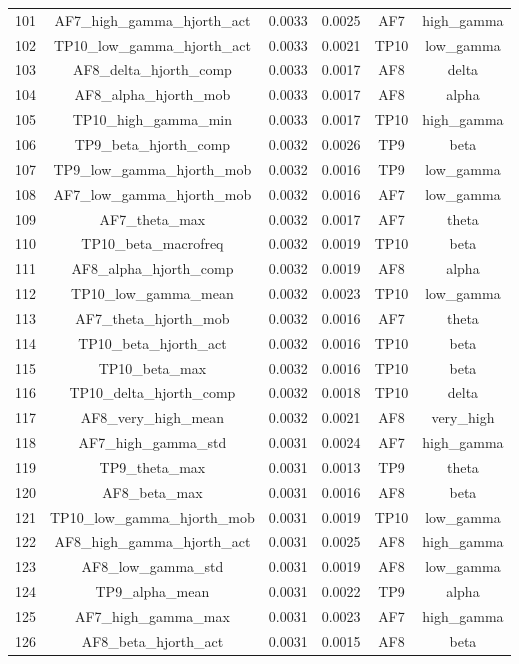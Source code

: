 \begin{table}[hptb]
\begin{table}
\begin{tabular}{cccccc}
101 & AF7_high_gamma_hjorth_act & 0.0033 & 0.0025 & AF7 & high_gamma \\
102 & TP10_low_gamma_hjorth_act & 0.0033 & 0.0021 & TP10 & low_gamma \\
103 & AF8_delta_hjorth_comp & 0.0033 & 0.0017 & AF8 & delta \\
104 & AF8_alpha_hjorth_mob & 0.0033 & 0.0017 & AF8 & alpha \\
105 & TP10_high_gamma_min & 0.0033 & 0.0017 & TP10 & high_gamma \\
106 & TP9_beta_hjorth_comp & 0.0032 & 0.0026 & TP9 & beta \\
107 & TP9_low_gamma_hjorth_mob & 0.0032 & 0.0016 & TP9 & low_gamma \\
108 & AF7_low_gamma_hjorth_mob & 0.0032 & 0.0016 & AF7 & low_gamma \\
109 & AF7_theta_max & 0.0032 & 0.0017 & AF7 & theta \\
110 & TP10_beta_macrofreq & 0.0032 & 0.0019 & TP10 & beta \\
111 & AF8_alpha_hjorth_comp & 0.0032 & 0.0019 & AF8 & alpha \\
112 & TP10_low_gamma_mean & 0.0032 & 0.0023 & TP10 & low_gamma \\
113 & AF7_theta_hjorth_mob & 0.0032 & 0.0016 & AF7 & theta \\
114 & TP10_beta_hjorth_act & 0.0032 & 0.0016 & TP10 & beta \\
115 & TP10_beta_max & 0.0032 & 0.0016 & TP10 & beta \\
116 & TP10_delta_hjorth_comp & 0.0032 & 0.0018 & TP10 & delta \\
117 & AF8_very_high_mean & 0.0032 & 0.0021 & AF8 & very_high \\
118 & AF7_high_gamma_std & 0.0031 & 0.0024 & AF7 & high_gamma \\
119 & TP9_theta_max & 0.0031 & 0.0013 & TP9 & theta \\
120 & AF8_beta_max & 0.0031 & 0.0016 & AF8 & beta \\
121 & TP10_low_gamma_hjorth_mob & 0.0031 & 0.0019 & TP10 & low_gamma \\
122 & AF8_high_gamma_hjorth_act & 0.0031 & 0.0025 & AF8 & high_gamma \\
123 & AF8_low_gamma_std & 0.0031 & 0.0019 & AF8 & low_gamma \\
124 & TP9_alpha_mean & 0.0031 & 0.0022 & TP9 & alpha \\
125 & AF7_high_gamma_max & 0.0031 & 0.0023 & AF7 & high_gamma \\
126 & AF8_beta_hjorth_act & 0.0031 & 0.0015 & AF8 & beta \\

\end{tabular}
\end{table}
\end{table}
